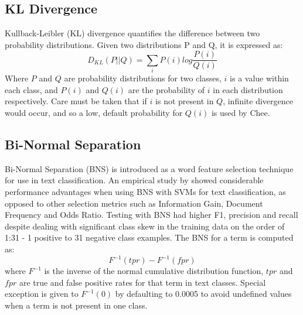 \documentclass[twoside,11pt]{article}
\begin{document}
\subsection{KL Divergence}
Kullback-Leibler (KL) divergence quantifies the difference between two probability distributions. Given two distributions P and Q, it is expressed as:
\[
  D_{KL}(P||Q) = \sum_{i}P(i)log\frac{P(i)}{Q(i)}
\]
Where $P$ and $Q$ are probability distributions for two classes, $i$ is a value within each class, and $P(i)$ and $Q(i)$ are the probability of $i$ in each distribution respectively. Care must be taken that if $i$ is not present in $Q$, infinite divergence would occur, and so a low, default probability for $Q(i)$ is used by Chee.

\subsection{Bi-Normal Separation}
Bi-Normal Separation (BNS) is introduced as a word feature selection technique for use in text classification. An empirical study by \citet{Forman} showed considerable performance advantages when using BNS with SVMs for text classification, as opposed to other selection metrics such as Information Gain, Document Frequency and Odds Ratio. Testing with BNS had higher F1, precision and recall despite dealing with significant class skew in the training data on the order of 1:31 - 1 positive to 31 negative class examples. The BNS for a term is computed as:
\[
  F^{-1}(tpr) - F^{-1}(fpr)
\]
where $F^{-1}$ is the inverse of the normal cumulative distribution function, $tpr$ and $fpr$ are true and false positive rates for that term in text classes. Special exception is given to $F^{-1}(0)$ by defaulting to 0.0005 to avoid undefined values when a term is not present in one class.
\end{document}

